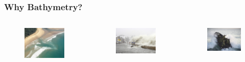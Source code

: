 \documentclass[7pt]{beamer}
\begin{document}
\begin{frame}
\frametitle{Why Bathymetry?}
\begin{columns}

\begin{figure}[h!]
\includegraphics[width=.80\linewidth]{img/Rip_C.jpg}\hfill
\end{figure}

\begin{figure}[h]
\includegraphics[width=.90\linewidth]{img/C_Flood.jpg}\hfill
\end{figure}
\begin{figure}[h]
\includegraphics[width=.90\linewidth]{img/Navy_S.jpg}
\end{figure}


\end{columns}

\end{frame}
\end{document}
